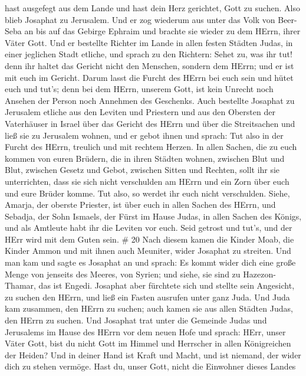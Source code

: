 hast ausgefegt aus dem Lande und hast dein Herz gerichtet, Gott zu
suchen.  Also blieb Josaphat zu Jerusalem. Und er zog
wiederum aus unter das Volk von Beer-Seba an bis auf das Gebirge Ephraim
und brachte sie wieder zu dem HErrn, ihrer Väter Gott.  Und
er bestellte Richter im Lande in allen festen Städten Judas, in einer
jeglichen Stadt etliche,  und sprach zu den Richtern: Sehet
zu, was ihr tut! denn ihr haltet das Gericht nicht den Menschen, sondern
dem HErrn; und er ist mit euch im Gericht.  Darum lasst die
Furcht des HErrn bei euch sein und hütet euch und tut's; denn bei dem
HErrn, unserem Gott, ist kein Unrecht noch Ansehen der Person noch
Annehmen des Geschenks.  Auch bestellte Josaphat zu
Jerusalem etliche aus den Leviten und Priestern und aus den Obersten der
Vaterhäuser in Israel über das Gericht des HErrn und über die
Streitsachen und ließ sie zu Jerusalem wohnen,  und er gebot
ihnen und sprach: Tut also in der Furcht des HErrn, treulich und mit
rechtem Herzen.  In allen Sachen, die zu euch kommen von
euren Brüdern, die in ihren Städten wohnen, zwischen Blut und Blut,
zwischen Gesetz und Gebot, zwischen Sitten und Rechten, sollt ihr sie
unterrichten, dass sie sich nicht verschulden am HErrn und ein Zorn über
euch und eure Brüder komme. Tut also, so werdet ihr euch nicht
verschulden.  Siehe, Amarja, der oberste Priester, ist über
euch in allen Sachen des HErrn, und Sebadja, der Sohn Ismaels, der Fürst
im Hause Judas, in allen Sachen des Königs, und als Amtleute habt ihr
die Leviten vor euch. Seid getrost und tut's, und der HErr wird mit dem
Guten sein. \# 20  Nach diesem kamen die Kinder Moab, die
Kinder Ammon und mit ihnen auch Meuniter, wider Josaphat zu streiten.
 Und man kam und sagte es Josaphat an und sprach: Es kommt
wider dich eine große Menge von jenseits des Meeres, von Syrien; und
siehe, sie sind zu Hazezon-Thamar, das ist Engedi.  Josaphat
aber fürchtete sich und stellte sein Angesicht, zu suchen den HErrn, und
ließ ein Fasten ausrufen unter ganz Juda.  Und Juda kam
zusammen, den HErrn zu suchen; auch kamen sie aus allen Städten Judas,
den HErrn zu suchen.  Und Josaphat trat unter die Gemeinde
Judas und Jerusalems im Hause des HErrn vor dem neuen Hofe 
und sprach: HErr, unser Väter Gott, bist du nicht Gott im Himmel und
Herrscher in allen Königreichen der Heiden? Und in deiner Hand ist Kraft
und Macht, und ist niemand, der wider dich zu stehen vermöge.
 Hast du, unser Gott, nicht die Einwohner dieses Landes
